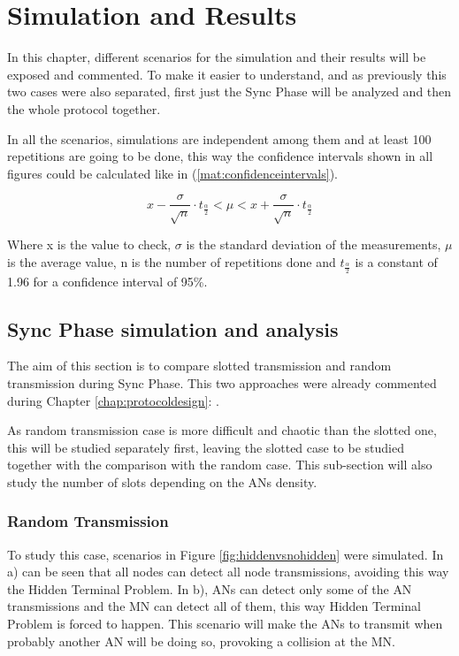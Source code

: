 \chapter{Simulation and Results}
\label{chap:simulationandresults}

In this chapter, different scenarios for the simulation and their results will be exposed and commented. To make it easier to understand, and as 
previously this two cases were also separated, first just the Sync Phase will be analyzed and then the whole protocol together.

In all the scenarios, simulations are independent among them and at least 100 repetitions are going to be done, this way the confidence intervals
shown in all figures could be calculated like in (\ref{mat:confidenceintervals}).

\begin{equation}
  x-\frac{\sigma}{\sqrt{n}}\cdot t_{\frac{\alpha}{2}} < \mu < x+\frac{\sigma}{\sqrt{n}}\cdot t_{\frac{\alpha}{2}}
  \label{mat:confidenceintervals}
\end{equation}

Where x is the value to check, $\sigma$ is the standard deviation of the measurements, $\mu$ is the average value, n is the number of repetitions done and 
$t_{\frac{\alpha}{2}}$ is a constant of 1.96 for a confidence interval of 95\%.

\section{Sync Phase simulation and analysis}

The aim of this section is to compare slotted transmission and random transmission during Sync Phase. This two approaches were already commented 
during Chapter \ref{chap:protocoldesign}: .

As random transmission case is more difficult and chaotic than the slotted one, this will be studied separately first, leaving the slotted case 
to be studied together with the comparison with the random case. This sub-section will also study the number of slots depending on the \acp{AN} 
density.

\subsection{Random Transmission}

To study this case, scenarios in Figure \ref{fig:hiddenvsnohidden} were simulated. In a) can be seen that all nodes can detect all node 
transmissions, avoiding this way the Hidden Terminal Problem. In b), \acp{AN} can detect only some of the \ac{AN} transmissions and the 
\ac{MN} can detect all of them, this way Hidden Terminal Problem is forced to happen. This scenario will make the \acp{AN} to transmit when 
probably another \ac{AN} will be doing so, provoking a collision at the \ac{MN}.

